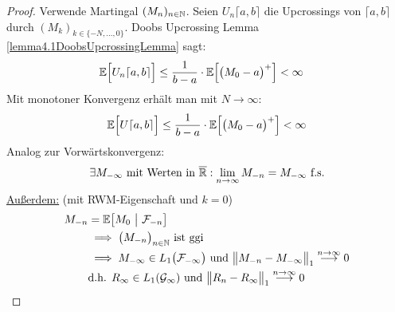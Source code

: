 \begin{proof}
Verwende Martingal $(M_n)_{n\in\mathbb{N}}$. Seien $U_n\lceil a,b\rceil$ die Upcrossings von $\lceil a,b\rceil$ durch $(M_k)_{k\in\lbrace-N,\ldots,0\rbrace}$. Doobs Upcrossing Lemma \ref{lemma4.1DoobsUpcrossingLemma} sagt:
\begin{align*}
\mathbb{E}\Big[U_n\lceil a,b\rceil\Big]
&\leq
\frac{1}{b-a}\cdot\mathbb{E}\Big[\big(M_0-a\big)^+\Big]<\infty
\end{align*}
Mit monotoner Konvergenz erhält man mit $N\to\infty$:
\begin{align*}
\mathbb{E}\Big[U\lceil a,b\rceil\Big]\leq\frac{1}{b-a}\cdot\mathbb{E}\Big[\big(M_0-a\big)^+\Big]<\infty
\end{align*}
Analog zur Vorwärtskonvergenz:
\begin{align*}
\exists M_{-\infty}\text{ mit Werten in }\overline{\mathbb{R}}:\lim\limits_{n\to\infty} M_{-n}=M_{-\infty}\text{ f.s.}
\end{align*}
\ul{Außerdem:} (mit RWM-Eigenschaft und $k=0$)
\begin{align*}
M_{-n}
&=\mathbb{E}\big[M_0~\big|~\mathcal{F}_{-n}\big]\\
&\implies \big(M_{-n}\big)_{n\in\mathbb{N}}\text{ ist ggi}\\
&\implies M_{-\infty}\in L_1\big(\mathcal{F}_{-\infty}\big)\text{ und }\big\Vert M_{-n}-M_{-\infty}\big\Vert_1\stackrel{n\to\infty}{\longrightarrow}0\\
&\text{d.h. }R_\infty\in L_1(\mathcal{G}_\infty)\text{ und }\big\Vert R_n-R_\infty\big\Vert_1\stackrel{n\to\infty}{\longrightarrow}0
\end{align*}
\end{proof}

